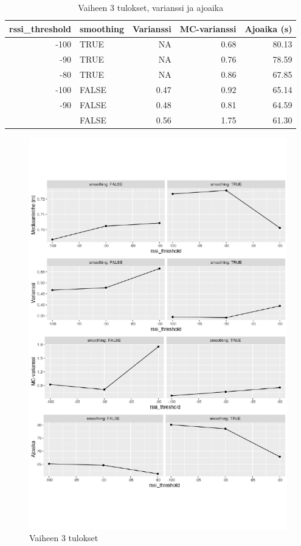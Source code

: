 \documentclass[
  12pt,
  a4paper, twoside]{book}
\begin{document}
\begin{table}

\caption{\label{tab:vaihe-3-tulokset-varianssi}Vaiheen 3 tulokset, varianssi ja ajoaika}
\centering
\begin{tabular}[t]{rlrrr}
\toprule
rssi\_threshold & smoothing & Varianssi & MC-varianssi & Ajoaika (s)\\
\midrule
-100 & TRUE & NA & 0.68 & 80.13\\
-90 & TRUE & NA & 0.76 & 78.59\\
-80 & TRUE & NA & 0.86 & 67.85\\
-100 & FALSE & 0.47 & 0.92 & 65.14\\
-90 & FALSE & 0.48 & 0.81 & 64.59\\
\addlinespace
-80 & FALSE & 0.56 & 1.75 & 61.30\\
\bottomrule
\end{tabular}
\end{table}

\begin{figure}[H]
\centering
\includegraphics[width=15cm]{phase3_results_vertical_safe}
\caption{Vaiheen 3 tulokset}
\label{fig:phase3_results}
\end{figure}
\end{document}
